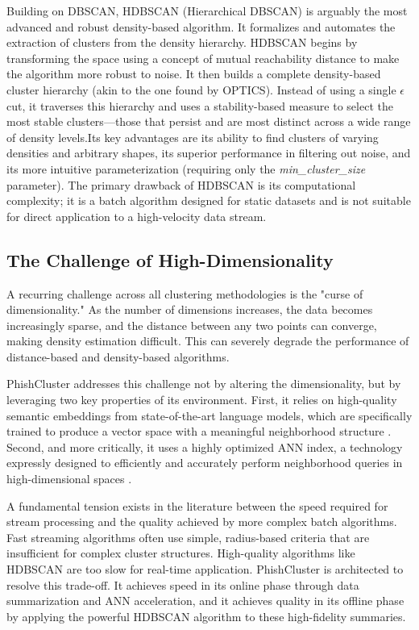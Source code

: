 \documentclass[journal,article,submit,pdftex,moreauthors]{Definitions/mdpi}
\begin{document}
Building on DBSCAN, HDBSCAN (Hierarchical DBSCAN) \cite{ref_hdbscan} is arguably the most advanced and robust density-based algorithm. It formalizes and automates the extraction of clusters from the density hierarchy. HDBSCAN begins by transforming the space using a concept of mutual reachability distance to make the algorithm more robust to noise. It then builds a complete density-based cluster hierarchy (akin to the one found by OPTICS). Instead of using a single $\epsilon$ cut, it traverses this hierarchy and uses a stability-based measure to select the most stable clusters—those that persist and are most distinct across a wide range of density levels.Its key advantages are its ability to find clusters of varying densities and arbitrary shapes, its superior performance in filtering out noise, and its more intuitive parameterization (requiring only the \textit{min\_cluster\_size} parameter). The primary drawback of HDBSCAN is its computational complexity; it is a batch algorithm designed for static datasets and is not suitable for direct application to a high-velocity data stream.


\subsection{The Challenge of High-Dimensionality}

A recurring challenge across all clustering methodologies is the "curse of dimensionality." As the number of dimensions increases, the data becomes increasingly sparse, and the distance between any two points can converge, making density estimation difficult. This can severely degrade the performance of distance-based and density-based algorithms.

PhishCluster addresses this challenge not by altering the dimensionality, but by leveraging two key properties of its environment. First, it relies on high-quality semantic embeddings from state-of-the-art language models, which are specifically trained to produce a vector space with a meaningful neighborhood structure \cite{ref_reimers, ref_wang_minilm}. Second, and more critically, it uses a highly optimized ANN index, a technology expressly designed to efficiently and accurately perform neighborhood queries in high-dimensional spaces \cite{ref_subramanya, ref_malkov}.

A fundamental tension exists in the literature between the speed required for stream processing and the quality achieved by more complex batch algorithms. Fast streaming algorithms often use simple, radius-based criteria that are insufficient for complex cluster structures. High-quality algorithms like HDBSCAN are too slow for real-time application. PhishCluster is architected to resolve this trade-off. It achieves speed in its online phase through data summarization and ANN acceleration, and it achieves quality in its offline phase by applying the powerful HDBSCAN algorithm to these high-fidelity summaries.
\end{document}
